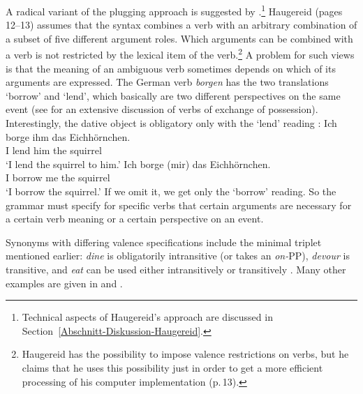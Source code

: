 \begin{exe}
\begin{xlist}[iv.]
\begin{exe}
\begin{xlist}[iv.]
A radical variant of the plugging approach is suggested by \citet{Haugereid2009a}.\footnote{
  Technical aspects of Haugereid's approach are discussed in Section~\ref{Abschnitt-Diskussion-Haugereid}.
} Haugereid
(pages\,12--13) assumes that the syntax combines a verb with an arbitrary combination of a subset of
five different argument roles. Which arguments can be combined with a verb is not restricted by the
lexical item of the verb.\footnote{ 
  Haugereid has the possibility to impose valence restrictions on verbs, but he claims that he uses
  this possibility just in order to get a more efficient processing of his computer implementation (p.\,13).
}
A problem for such views is that the meaning of an ambiguous verb sometimes depends on which of its
arguments are expressed.  The German verb \emph{borgen} has the two translations `borrow' and
`lend', which basically are two different perspectives on the same event (see
 for an extensive discussion of verbs of exchange of possession).
Interestingly, the dative object is obligatory only with the `lend' reading \citep[]{MuellerGTBuch1}: 
\eal
\ex 
\gll Ich borge ihm das Eichhörnchen.\\
     I   lend  him the squirrel\\
\glt `I lend the squirrel to him.'
\ex 
\gll Ich borge (mir) das Eichhörnchen.\\
     I borrow me the squirrel\\
\glt `I borrow the squirrel.'
\zl
If we omit it, we get only the `borrow' reading. 
So the grammar must specify for specific verbs that certain arguments are
necessary for a certain verb meaning or a certain perspective on an event.

Synonyms with differing valence specifications include the minimal triplet mentioned earlier: \emph{dine} is obligatorily intransitive (or takes an \emph{on-}PP), \emph{devour} is transitive, and \emph{eat} can be used either intransitively or transitively \citep[--90]{Dowty89b-u}.  Many other examples are given in  \citet{Levin93a-u} and \citet{LRH2005a-u}.
%



\end{xlist}
\end{exe}
\end{xlist}
\end{exe}
